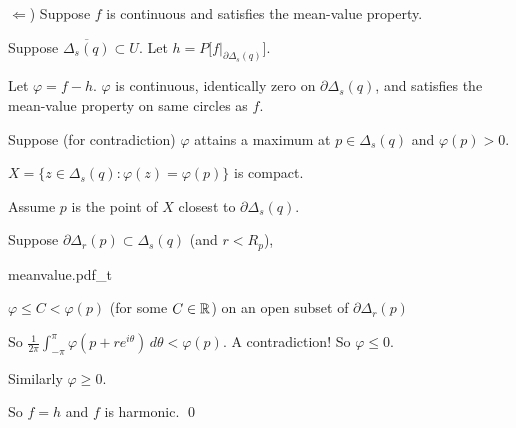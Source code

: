 \documentclass[10pt,aspectratio=169]{beamer}
\begin{document}
\begin{frame}
$\Leftarrow$) \quad \pause
Suppose $f$ is continuous and satisfies the
mean-value property.

\medskip
\pause

Suppose $\overline{\Delta_s(q)} \subset U$.
\qquad
\pause
Let $h = P\bigl[f|_{\partial \Delta_s(q)}\big]$.

\medskip
\pause
Let $\varphi = f-h$.
\quad
\pause
$\varphi$ is continuous,
\pause
identically zero on $\partial \Delta_s(q)$,
\pause
and satisfies the mean-value property on same circles as $f$.

\medskip
\pause
Suppose (for contradiction) $\varphi$
attains a maximum at $p \in \Delta_s(q)$ and
$\varphi(p) > 0$.

\medskip
\pause
$X = \bigl\{ z \in \Delta_s(q) : \varphi(z) = \varphi(p) \bigr\}$ is compact.

\medskip
\pause
Assume $p$ is the point of $X$ closest to $\partial \Delta_s(q)$.

\medskip
\pause
Suppose $\partial \Delta_r(p) \subset \Delta_s(q)$ (and $r < R_p$),

\vspace*{-0.8in}
\hfill
{meanvalue.pdf_t}

\vspace*{-0.5in}

\pause
$\varphi \leq C < \varphi(p)$ (for some $C \in {\mathbb{R}}$) on an open subset of $\partial \Delta_r(p)$

\medskip
\pause
So
\quad
$\displaystyle
\frac{1}{2\pi} \int_{-\pi}^{\pi} \varphi(p+re^{i\theta})\, d\theta <
\varphi(p)$.
\pause
\quad
A contradiction!
\pause
\quad
So $\varphi \leq 0$.

\medskip
\pause

Similarly $\varphi \geq 0$.

\medskip
\pause

So $f=h$ and $f$ is harmonic. \qed
\end{frame}
\end{document}
